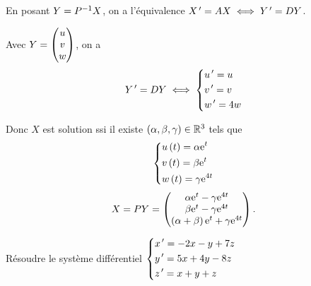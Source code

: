\begin{corr}
En posant \(Y=P^{-1} X\), on a l'équivalence \(X^{\,\prime}=AX\iff Y^{\,\prime}=DY\).

Avec \(Y=\begin{pmatrix}u\\v\\w\end{pmatrix}\), on a \[Y^{\,\prime}=DY\iff\begin{dcases}
u^{\,\prime}=u \\
v^{\,\prime}=v \\
w^{\,\prime}=4w
\end{dcases}\]

Donc \(X\) est solution ssi il existe \(\left(\alpha,\beta,\gamma\right)\in\mathbb{R}^3\) tels que \[\begin{dcases}
u\left(t\right)=\alpha\mathrm{e}^{t} \\
v\left(t\right)=\beta\mathrm{e}^{t} \\
w\left(t\right)=\gamma\mathrm{e}^{4t}
\end{dcases}\] \ie \[X=PY=\begin{pmatrix}\alpha\mathrm{e}^{t}-\gamma\mathrm{e}^{4t}\\\beta\mathrm{e}^{t}-\gamma\mathrm{e}^{4t}\\\left(\alpha+\beta\right)\mathrm{e}^{t}+\gamma\mathrm{e}^{4t}\end{pmatrix}.\]
\end{corr}

\begin{exo}
Résoudre le système différentiel \(\begin{dcases}
x^{\,\prime}=-2x-y+7z \\
y^{\,\prime}=5x+4y-8z \\
z^{\,\prime}=x+y+z
\end{dcases}\)
\end{exo}

